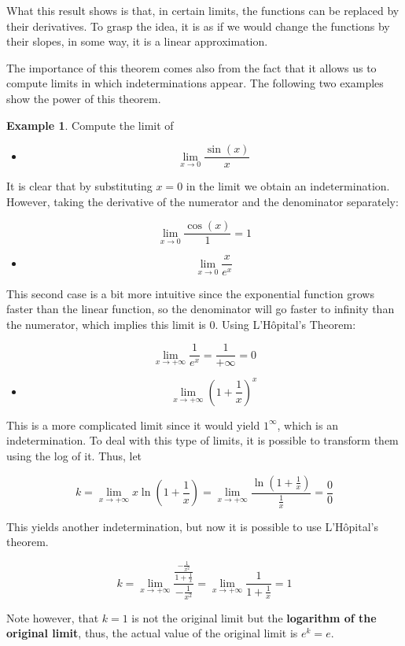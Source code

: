 \documentclass[11pt]{article}
\providecommand{\tightlist}{%
      \setlength{\itemsep}{0pt}\setlength{\parskip}{0pt}}
\theoremstyle{definition}
\newtheorem{example}{Example}
\theoremstyle{plain}
\begin{document}
What this result shows is that, in certain limits, the functions can be
replaced by their derivatives. To grasp the idea, it is as if we would
change the functions by their slopes, in some way, it is a linear
approximation.

The importance of this theorem comes also from the fact that it allows
us to compute limits in which indeterminations appear. The following two
examples show the power of this theorem.

\begin{example}
Compute the limit of

\begin{itemize}
\tightlist
\item
  \[\lim_{x\rightarrow 0}{\frac{\sin(x)}{x}}\]
\end{itemize}

It is clear that by substituting \(x = 0\) in the limit we obtain an
indetermination. However, taking the derivative of the numerator and the
denominator separately:

\[
\lim_{x\rightarrow 0}{\frac{\cos(x)}{1}} = 1
\]

\begin{itemize}
\tightlist
\item
  \[\lim_{x\rightarrow 0}{\frac{x}{e^x}}\]
\end{itemize}

This second case is a bit more intuitive since the exponential function
grows faster than the linear function, so the denominator will go faster
to infinity than the numerator, which implies this limit is \(0\). Using
L'Hôpital's Theorem:

\[
\lim_{x\rightarrow +\infty}{\frac{1}{e^x}} = \frac{1}{+\infty} = 0
\]

\begin{itemize}
\tightlist
\item
  \[\lim_{x\rightarrow +\infty}{\left(1 + \frac{1}{x}\right)^x}\]
\end{itemize}

This is a more complicated limit since it would yield \(1^{\infty}\),
which is an indetermination. To deal with this type of limits, it is
possible to transform them using the log of it. Thus, let

\[
k = \lim_{x\rightarrow +\infty}{x\ln\left(1 + \frac{1}{x}\right)} = \lim_{x\rightarrow +\infty}{\frac{\ln\left(1 + \frac{1}{x}\right)}{\frac{1}{x}}} = \frac{0}{0}
\]

This yields another indetermination, but now it is possible to use
L'Hôpital's theorem.

\[
k = \lim_{x\rightarrow +\infty}{\frac{\frac{-\frac{1}{x^2}}{1 + \frac{1}{x}}}{-\frac{1}{x^2}}} = \lim_{x\rightarrow +\infty}{\frac{1}{1 + \frac{1}{x}}} = 1
\]

Note however, that \(k = 1\) is not the original limit but the
\textbf{logarithm of the original limit}, thus, the actual value of the
original limit is \(e^k = e\).
\end{example}
\end{document}
